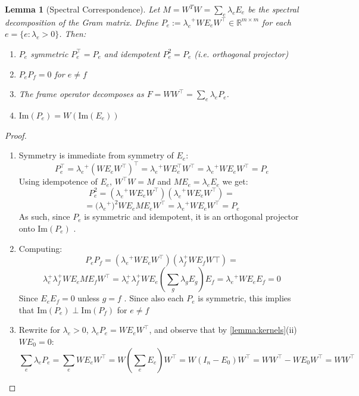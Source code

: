\documentclass{article}
\theoremstyle{plain}
\newtheorem{lemma}{Lemma}[section]
\numberwithin{equation}{section}
\theoremstyle{definition}
\theoremstyle{remark}
\begin{document}
\begin{lemmaproofbox}
    \begin{lemma}[Spectral Correspondence]\label{lemma:spectral_correspondence} Let $M = W^TW = \sum_{e}\lambda_e E_e$ be the spectral decomposition of the Gram matrix. Define $P_e:={\lambda_e}^{+}WE_eW^\top \in \mathbb{R}^{m\times m}$ for each $e = \{e: \lambda_e>0\}$. Then:
        \begin{enumerate}[label=(\roman*)]
            \item $P_e$ symmetric $P_e^\top = P_e$ and idempotent $P_e^2 = P_e$ (i.e. orthogonal projector)
            \item $P_eP_f = 0$ for $e\neq f$
            \item The frame operator decomposes as $F=WW^\top = \sum_{e}\lambda_e P_e$. 
            \item $\text{Im}(P_e) = W(\text{Im}(E_e))$ 
         \end{enumerate}
    \end{lemma}
    \begin{proof}
        \begin{enumerate}[label=(\roman*)]
            \item Symmetry is immediate from symmetry of $E_e$: $$P_e^\top  = {\lambda_e}^{+} (WE_eW^\top)^\top  = {\lambda_e}^{+}WE_e^\top W^\top = {\lambda_e}^{+}W E_e W^\top = P_e$$
Using idempotence of $E_e$, $W^\top W = M$ and $ME_e = \lambda_e E_e$ we get: $$P_e^2 = \left({\lambda_e}^{+}WE_eW^\top\right)\left({\lambda_e}^{+}WE_eW^\top\right)=$$
$$=\big({\lambda_e}^{+}\big)^2WE_eME_eW^\top = {\lambda_e}^{+}WE_eW^\top = P_e $$
As such, since $P_e$ is symmetric and idempotent, it is an orthogonal projector onto $\text{Im}(P_e)$ \cite{kato}. 
    \item Computing: $$P_eP_f = \left({\lambda_e}^{+}WE_eW^\top\right)\left(\lambda_f^+WE_fW\top\right) = $$$$\lambda_e^+\lambda_f^+ WE_eME_fW^\top  = \lambda_e^+\lambda_f^+WE_e\left(\sum_g \lambda_g E_g\right)E_f = {\lambda_e}^{+}WE_eE_f=0$$
Since $E_eE_f=0$ unless $g=f$ . Since also each $P_e$ is symmetric, this implies that $\text{Im}(P_e)\perp \text{Im}(P_f)$ for $e\neq f$ 
\item Rewrite for $\lambda_e>0$, $\lambda_e P_e = WE_e W^\top$, and observe that by \ref{lemma:kernels}(ii) $WE_0=0$:
$$\sum_{e}\lambda_eP_e = \sum_{e} WE_e W^\top = W\left(\sum_{e}E_e\right)W^\top = W\left(I_n-E_0\right)W^\top=  WW^\top - WE_0W^\top = WW^\top$$


\end{enumerate}
\end{proof}
\end{lemmaproofbox}
\end{document}

